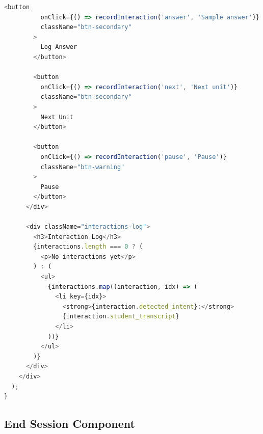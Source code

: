 \documentclass[12pt,a4paper,oneside]{article}
\begin{document}
\begin{lstlisting}[language=javascript]
        <button 
          onClick={() => recordInteraction('answer', 'Sample answer')}
          className="btn-secondary"
        >
          Log Answer
        </button>

        <button 
          onClick={() => recordInteraction('next', 'Next unit')}
          className="btn-secondary"
        >
          Next Unit
        </button>

        <button 
          onClick={() => recordInteraction('pause', 'Pause')}
          className="btn-warning"
        >
          Pause
        </button>
      </div>

      <div className="interactions-log">
        <h3>Interaction Log</h3>
        {interactions.length === 0 ? (
          <p>No interactions yet</p>
        ) : (
          <ul>
            {interactions.map((interaction, idx) => (
              <li key={idx}>
                <strong>{interaction.detected_intent}:</strong> 
                {interaction.student_transcript}
              </li>
            ))}
          </ul>
        )}
      </div>
    </div>
  );
}
\end{lstlisting}

\subsection{End Session Component}
\end{document}
